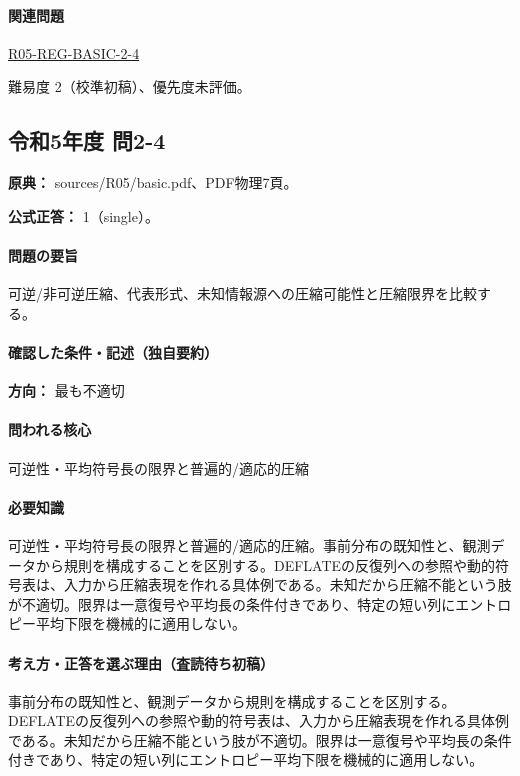 \paragraph{関連問題} \hyperref[q:r05-reg-basic-2-4]{R05-REG-BASIC-2-4}

\par 難易度 2（校準初稿）、優先度未評価。

\subsection{令和5年度 問2-4}
\label{q:r05-reg-basic-2-4}

\noindent\textbf{原典：} sources/R05/basic.pdf、PDF物理7頁。

\textbf{公式正答：} 1（single）。

\paragraph{問題の要旨} 可逆/非可逆圧縮、代表形式、未知情報源への圧縮可能性と圧縮限界を比較する。

\paragraph{確認した条件・記述（独自要約）}\mbox{}\par

\noindent\textbf{方向：} 最も不適切\par

\paragraph{問われる核心} 可逆性・平均符号長の限界と普遍的/適応的圧縮

\paragraph{必要知識} 可逆性・平均符号長の限界と普遍的/適応的圧縮。事前分布の既知性と、観測データから規則を構成することを区別する。DEFLATEの反復列への参照や動的符号表は、入力から圧縮表現を作れる具体例である。未知だから圧縮不能という肢が不適切。限界は一意復号や平均長の条件付きであり、特定の短い列にエントロピー平均下限を機械的に適用しない。

\paragraph{考え方・正答を選ぶ理由（査読待ち初稿）} 事前分布の既知性と、観測データから規則を構成することを区別する。DEFLATEの反復列への参照や動的符号表は、入力から圧縮表現を作れる具体例である。未知だから圧縮不能という肢が不適切。限界は一意復号や平均長の条件付きであり、特定の短い列にエントロピー平均下限を機械的に適用しない。

